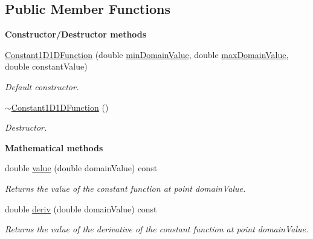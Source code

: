 \subsection*{Public Member Functions}
\begin{Indent}{\bf Constructor/\-Destructor methods}\par
\begin{DoxyCompactItemize}
\item 
\hyperlink{class_q_u_e_s_o_1_1_constant1_d1_d_function_ae506584ba937dfb2f706e56229c4d9fe}{Constant1\-D1\-D\-Function} (double \hyperlink{class_q_u_e_s_o_1_1_base1_d1_d_function_a4c110e621ef1ac557bbcc60d41f5a3c2}{min\-Domain\-Value}, double \hyperlink{class_q_u_e_s_o_1_1_base1_d1_d_function_ad2b80d0c52c0cb56c89f70f30b3bb19e}{max\-Domain\-Value}, double constant\-Value)
\begin{DoxyCompactList}\small\item\em Default constructor. \end{DoxyCompactList}\item 
\hyperlink{class_q_u_e_s_o_1_1_constant1_d1_d_function_afcc6e7dfa001ebc7e3ef374424404eae}{$\sim$\-Constant1\-D1\-D\-Function} ()
\begin{DoxyCompactList}\small\item\em Destructor. \end{DoxyCompactList}\end{DoxyCompactItemize}
\end{Indent}
\begin{Indent}{\bf Mathematical methods}\par
\begin{DoxyCompactItemize}
\item 
double \hyperlink{class_q_u_e_s_o_1_1_constant1_d1_d_function_aa80d085d1b5744396df97ec74055cf1f}{value} (double domain\-Value) const 
\begin{DoxyCompactList}\small\item\em Returns the value of the constant function at point {\ttfamily domain\-Value}. \end{DoxyCompactList}\item 
double \hyperlink{class_q_u_e_s_o_1_1_constant1_d1_d_function_af8f16be24483611f20246f67047e330b}{deriv} (double domain\-Value) const 
\begin{DoxyCompactList}\small\item\em Returns the value of the derivative of the constant function at point {\ttfamily domain\-Value}. \end{DoxyCompactList}\end{DoxyCompactItemize}
\end{Indent}
